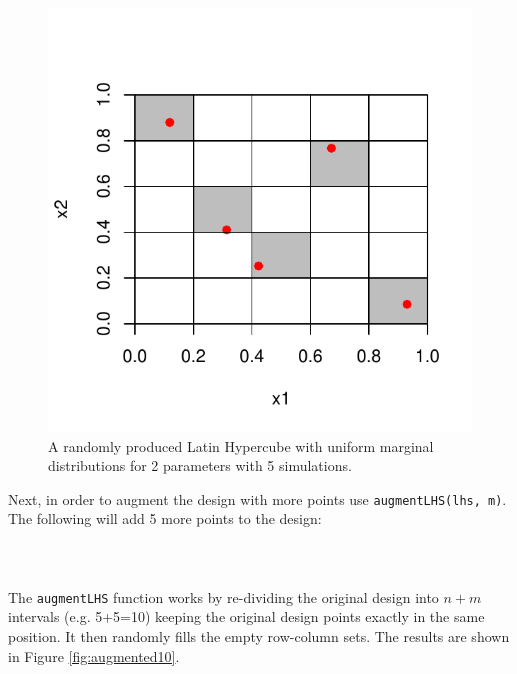 \documentclass[12pt]{article}
\begin{document}
\begin{figure}[p]
	\centering
		\includegraphics{original5.pdf}
	  \caption{A randomly produced Latin Hypercube with uniform marginal distributions for 2 parameters with 5 simulations.}
	\label{fig:original5}
\end{figure}

Next, in order to augment the design with more points use \texttt{augmentLHS(lhs, m)}.  The following will add 5 more points to the design:\\
\\
\indent{}\\
\\
The \texttt{augmentLHS} function works by re-dividing the original design into $n+m$ intervals (e.g. 5+5=10) keeping the original design points exactly in the same position.  It then randomly fills the empty row-column sets.  The results are shown in Figure \ref{fig:augmented10}.
\end{document}
